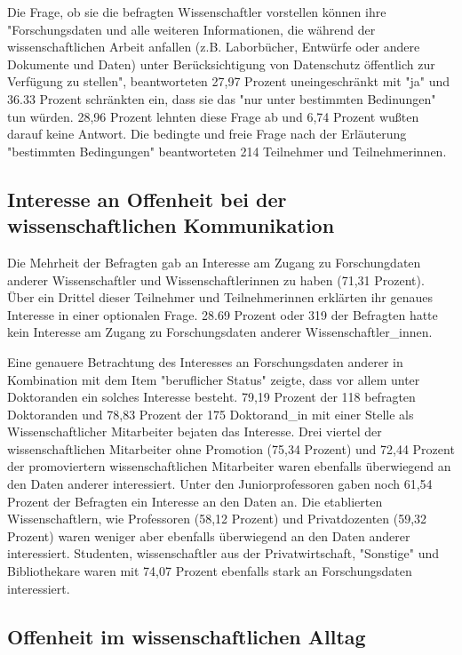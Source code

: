 Die Frage, ob sie die befragten Wissenschaftler vorstellen können ihre "Forschungsdaten und alle weiteren Informationen, die während der wissenschaftlichen Arbeit anfallen (z.B. Laborbücher, Entwürfe oder andere Dokumente und Daten) unter Berücksichtigung von Datenschutz öffentlich zur Verfügung zu stellen", beantworteten 27,97 Prozent uneingeschränkt mit "ja" und 36.33 Prozent schränkten ein, dass sie das "nur unter bestimmten Bedinungen" tun würden.  28,96 Prozent lehnten diese Frage ab und 6,74 Prozent wußten darauf keine Antwort. Die bedingte und freie Frage nach der Erläuterung "bestimmten Bedingungen" beantworteten 214 Teilnehmer und Teilnehmerinnen.

\subsection{Interesse an Offenheit bei der wissenschaftlichen Kommunikation}

Die Mehrheit der Befragten gab an Interesse am Zugang zu Forschungdaten anderer Wissenschaftler und Wissenschaftlerinnen zu haben (71,31 Prozent). Über ein Drittel dieser Teilnehmer und Teilnehmerinnen erklärten ihr genaues Interesse in einer optionalen Frage. 28.69 Prozent oder 319 der Befragten hatte kein Interesse am Zugang zu Forschungsdaten anderer Wissenschaftler_innen. 

Eine genauere Betrachtung des Interesses an Forschungsdaten anderer in Kombination mit dem Item "beruflicher Status" zeigte, dass vor allem unter Doktoranden ein solches Interesse besteht. 79,19 Prozent der 118 befragten Doktoranden und 78,83 Prozent der 175 Doktorand_in mit einer Stelle als Wissenschaftlicher Mitarbeiter bejaten das Interesse. Drei viertel der wissenschaftlichen Mitarbeiter ohne Promotion (75,34 Prozent) und 72,44 Prozent der promoviertern wissenschaftlichen Mitarbeiter waren ebenfalls überwiegend an den Daten anderer interessiert. Unter den Juniorprofessoren gaben noch 61,54 Prozent der Befragten ein Interesse an den Daten an. Die etablierten Wissenschaftlern, wie Professoren (58,12 Prozent) und Privatdozenten (59,32 Prozent) waren weniger aber ebenfalls überwiegend an den Daten anderer interessiert.  Studenten, wissenschaftler aus der Privatwirtschaft, "Sonstige" und Bibliothekare waren mit 74,07 Prozent ebenfalls stark an Forschungsdaten interessiert.

\subsection{Offenheit im wissenschaftlichen Alltag}

